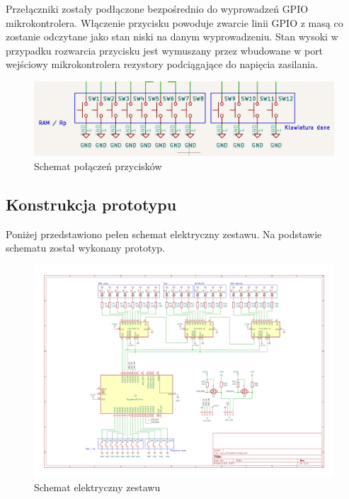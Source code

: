 \documentclass[../main.tex]{subfiles}
\begin{document}
Przełączniki zostały podłączone bezpośrednio do wyprowadzeń GPIO mikrokontrolera. Włączenie przycisku powoduje zwarcie linii GPIO z masą
co zostanie odczytane jako stan niski na danym wyprowadzeniu. Stan wysoki w przypadku rozwarcia przycisku jest  wymuszany przez wbudowane
w port wejściowy mikrokontrolera rezystory podciągające do napięcia zasilania.

\begin{figure}[H]
    \centering
    \includegraphics[width=\linewidth]{button_schemat.png}
    \caption{Schemat połączeń przycisków}
    \label{fig:button_connection}
\end{figure}

\subsection{Konstrukcja prototypu}

Poniżej przedstawiono pełen schemat elektryczny zestawu. Na podstawie schematu został wykonany prototyp.

\begin{figure}[H]
    \centering
    \includegraphics[width=\linewidth]{schemat.png}
    \caption{Schemat elektryczny zestawu}
    \label{fig:electrical_schematic}
\end{figure}
\end{document}
